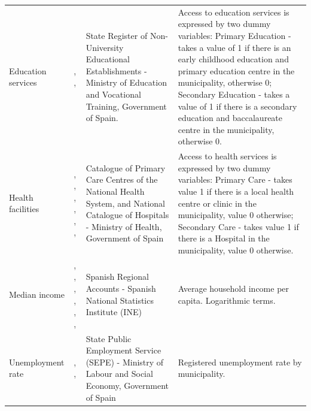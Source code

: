 \documentclass[a4paper,11pt,oneside]{article}
\begin{document}
{\begin{table}
\begin{tabular}{llll}
\cmidrule(r){2-4}
\parbox[c]{20mm}{Education services} & \parbox[c]{77mm}{ \cite{hoogstra2012gender},  \cite{kompil2019mapping}, \cite{goerlich2021distribucion}}                                   & \parbox[c]{45mm}{ State Register of Non-University Educational Establishments - Ministry of Education and Vocational Training, Government of Spain.            }  & \parbox[c]{76mm}{ Access to education services is expressed by two dummy variables: Primary Education - takes a value of 1 if there is an early childhood education and primary education centre in the municipality, otherwise 0; Secondary Education - takes a value of 1 if there is a secondary education and baccalaureate centre in the municipality, otherwise 0.} \\
\cmidrule(r){2-4}
\parbox[c]{20mm}{Health facilities}  & \parbox[c]{77mm}{ \cite{feser2006harnessing}, \cite{hoogstra2012gender}, \cite{mcgrail2014measuring}, \cite{pilkington2018travel}, \cite{papaioannou2018measuring}, \cite{kompil2019mapping}, \cite{goerlich2021distribucion}}                          & \parbox[c]{45mm}{ Catalogue of Primary Care Centres of the National Health System, and National Catalogue of Hospitals - Ministry of Health, Government of Spain} & \parbox[c]{76mm}{ Access to health services is expressed by two dummy variables: Primary Care - takes value 1 if there is a local health centre or clinic in the municipality, value 0 otherwise; Secondary Care - takes value 1 if there is a Hospital in the municipality, value 0 otherwise.}                \\
\cmidrule(r){2-4}
\parbox[c]{20mm}{Median income}      & \parbox[c]{77mm}{ \cite{carlino1987determinants}, \cite{hegerty2016commercial}, \cite{nguyen2019credit}, \cite{hegerty2020banking}, \cite{mishura2020providing}, \cite{coccorese2021cooperative}, \cite{carbo2023geographical}  }       & \parbox[c]{45mm}{ Spanish Regional Accounts - Spanish National Statistics Institute (INE) }             & \parbox[c]{76mm}{ Average household income per capita. Logarithmic terms.}  \\
\cmidrule(r){2-4}
\parbox[c]{20mm}{Unemployment rate}  & \parbox[c]{77mm}{ \cite{kubrin2011does}, \cite{hegerty2016commercial}, \cite{hasan2019economic} }        & \parbox[c]{45mm}{ State Public Employment Service (SEPE) - Ministry of Labour and Social Economy, Government of Spain }   & \parbox[c]{76mm}{ Registered unemployment rate by municipality.} \\                                 \bottomrule
\end{tabular}%


\end{table}}
\end{document}
